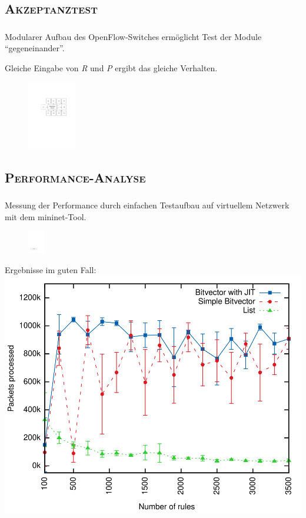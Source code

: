 \documentclass[xcolor=x11names,compress]{beamer}
\renewcommand{\(}{\begin{columns}}
\renewcommand{\)}{\end{columns}}
\newcommand{\<}[1]{\begin{column}{#1}}
\renewcommand{\>}{\end{column}}
\begin{document}
\subsection{\scshape Akzeptanztest}
\begin{frame}
  \frametitle{\insertsubsection}
  Modularer Aufbau des OpenFlow-Switches ermöglicht Test der Module \enquote{gegeneinander}.
  \begin{tcolorbox}[colback=blue!5!white,colframe=blue!75!black,title=Annahme,drop fuzzy shadow]
    Gleiche Eingabe von \textit{R} und \textit{P} ergibt das gleiche Verhalten.
  \end{tcolorbox}
  \begin{figure}
  \centering
  \includegraphics[height=3cm]{figures/ofswitch-acctest}
  \end{figure}
\end{frame}

\subsection{\scshape Performance-Analyse}
\begin{frame}
  \frametitle{\insertsubsection}
  Messung der Performance durch einfachen Testaufbau auf virtuellem Netzwerk mit dem \textsf{mininet}-Tool.
  \begin{figure}
  \centering
  \includegraphics[height=1cm]{figures/ofswitch-perftest}
  \end{figure}
\end{frame}

\begin{frame}
  Ergebnisse im guten Fall:
  \includegraphics[height=0.9\textheight]{figures/eval_b}
\end{frame}
\end{document}
